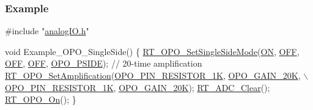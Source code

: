 \subsubsection*{Example}


\begin{DoxyCode}
\textcolor{preprocessor}{#include "\mbox{\hyperlink{a00002}{analogIO.h}}"}

\textcolor{keywordtype}{void} Example\_OPO\_SingleSide()
\{
    \mbox{\hyperlink{a00002_a6438defc0d6280f2b5baedc039f2e314}{RT\_OPO\_SetSingleSideMode}}(\mbox{\hyperlink{a00020_ab43e533f3793920486fb81c580f71564a977d478dacaae531f95695750d1e9d03}{ON}}, \mbox{\hyperlink{a00020_ab43e533f3793920486fb81c580f71564aac132f2982b98bcaa3445e535a03ff75}{OFF}}, \mbox{\hyperlink{a00020_ab43e533f3793920486fb81c580f71564aac132f2982b98bcaa3445e535a03ff75}{OFF}}, \mbox{\hyperlink{a00020_ab43e533f3793920486fb81c580f71564aac132f2982b98bcaa3445e535a03ff75}{OFF}}, 
      \mbox{\hyperlink{a00002_afb2207320139ac264d5cc1600d3cae9ea740f1053bc0489a53c4cfe9bfc3de403}{OPO\_PSIDE}});
    \textcolor{comment}{// 20-time amplification}
    \mbox{\hyperlink{a00002_ab2a6c21c91c7f05f3de9fefbd30ff95b}{RT\_OPO\_SetAmplification}}(\mbox{\hyperlink{a00002_a4600c8687e3e17269633cb3fbd771af9a7b2e9c0067b4d8197ded8832c5615120}{OPO\_PIN\_RESISTOR\_1K}}, 
      \mbox{\hyperlink{a00002_a6424f6db97a2e691b73af9c4053f1650a44bf632448f2bed40aad8456d4ab211e}{OPO\_GAIN\_20K}}, \(\backslash\)
                            \mbox{\hyperlink{a00002_a4600c8687e3e17269633cb3fbd771af9a7b2e9c0067b4d8197ded8832c5615120}{OPO\_PIN\_RESISTOR\_1K}}, \mbox{\hyperlink{a00002_a6424f6db97a2e691b73af9c4053f1650a44bf632448f2bed40aad8456d4ab211e}{OPO\_GAIN\_20K}});
    \mbox{\hyperlink{a00002_a00318bd4fc3ce7ad4f03124b91891f4f}{RT\_ADC\_Clear}}();
    \mbox{\hyperlink{a00002_a6ce23f7d735a1eedc00c509721b79446}{RT\_OPO\_On}}();
\}


\end{DoxyCode}
